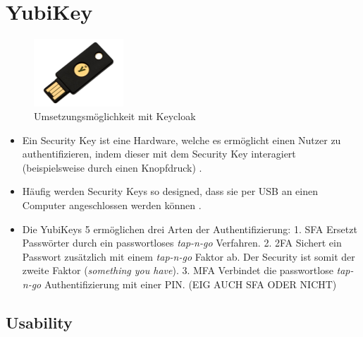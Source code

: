 \section{YubiKey} \label{Yubikey}

\begin{figure}[h]
	\centering 
	\includegraphics[width=0.3\textwidth]{img/abbildungen/yubikey.jpeg}
	\captionsetup{format=hang}
	\caption{Umsetzungsmöglichkeit mit Keycloak}
\end{figure}

 \begin{itemize}
    \item Ein Security Key ist eine Hardware, welche es ermöglicht einen Nutzer zu authentifizieren, indem dieser mit dem Security Key interagiert (beispielsweise durch einen Knopfdruck) \cite{reynolds2018tale}.
    \item Häufig werden Security Keys so designed, dass sie per USB an einen Computer angeschlossen werden können \cite{reynolds2018tale}.
    \item Die YubiKeys 5 ermöglichen drei Arten der Authentifizierung:
    1. \ac{SFA} Ersetzt Passwörter durch ein passwortloses \textit{tap-n-go} Verfahren.
    2. \ac{2FA} Sichert ein Passwort zusätzlich mit einem \textit{tap-n-go} Faktor ab. Der Security ist somit der zweite Faktor (\textit{something you have}).
    3. \ac{MFA} Verbindet die passwortlose \textit{tap-n-go} Authentifizierung mit einer PIN. (EIG AUCH SFA ODER NICHT)
 \end{itemize}

\subsection{Usability}

